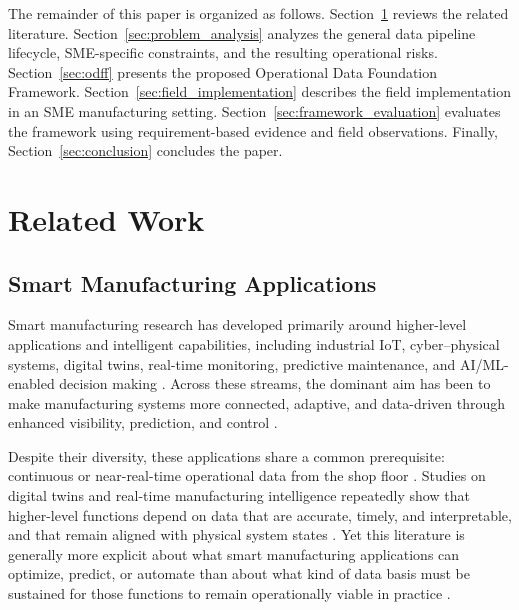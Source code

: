\documentclass[systems,article,submit,pdftex,moreauthors]{Definitions/mdpi}
\begin{document}
The remainder of this paper is organized as follows. Section~\ref{sec:related_work} reviews the related literature. Section~\ref{sec:problem_analysis} analyzes the general data pipeline lifecycle, SME-specific constraints, and the resulting operational risks. Section~\ref{sec:odff} presents the proposed Operational Data Foundation Framework. Section~\ref{sec:field_implementation} describes the field implementation in an SME manufacturing setting. Section~\ref{sec:framework_evaluation} evaluates the framework using requirement-based evidence and field observations. Finally, Section~\ref{sec:conclusion} concludes the paper.


\section{Related Work}
\label{sec:related_work}

\subsection{Smart Manufacturing Applications}
\label{sec:smart_manufacturing_applications}

Smart manufacturing research has developed primarily around higher-level applications and intelligent capabilities, including industrial IoT, cyber--physical systems, digital twins, real-time monitoring, predictive maintenance, and AI/ML-enabled decision making \cite{rozhok2026advanced, bueno2020smart, cinar2020digital, atalay2022digital}. Across these streams, the dominant aim has been to make manufacturing systems more connected, adaptive, and data-driven through enhanced visibility, prediction, and control \cite{rozhok2026advanced, bueno2020smart, song2025smart}.

Despite their diversity, these applications share a common prerequisite: continuous or near-real-time operational data from the shop floor \cite{nguyen2025aidriven, tao2017digital, ding2019digital}. Studies on digital twins and real-time manufacturing intelligence repeatedly show that higher-level functions depend on data that are accurate, timely, and interpretable, and that remain aligned with physical system states \cite{nguyen2025aidriven, ojstersek2023optimizing, qamsane2019digital}. Yet this literature is generally more explicit about what smart manufacturing applications can optimize, predict, or automate than about what kind of data basis must be sustained for those functions to remain operationally viable in practice \cite{rozhok2026advanced, ciano2021digital, nguyen2025aidriven}.
\end{document}
